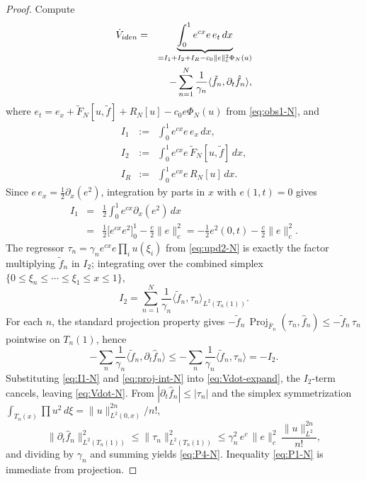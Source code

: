 \documentclass[10pt,a4paper]{amsart}
\DeclareMathOperator{\Proj}{Proj}
\begin{document}
\begin{proof}
Compute
\begin{eqnarray}
\dot V_{\rm iden} &=& \underbrace{\int_0^1 e^{cx}e\,e_t\,dx}_{=I_1+I_2+I_R-c_0\|e\|_c^2\Phi_N(u)} \nonumber\\
&& -\sum_{n=1}^N\frac{1}{\gamma_n}\langle\tilde f_n,\partial_t\hat f_n\rangle, \label{eq:Vdot-expand}
\end{eqnarray}
where $e_t=e_x+\tilde F_N[u,\tilde f]+R_N[u]-c_0 e\Phi_N(u)$ from \eqref{eq:obs1-N}, and
\begin{eqnarray}
I_1 &:=& \int_0^1 e^{cx}e\,e_x\,dx, \nonumber\\
I_2 &:=& \int_0^1 e^{cx}e\,\tilde F_N[u,\tilde f]\,dx, \nonumber\\
I_R &:=& \int_0^1 e^{cx}e\,R_N[u]\,dx. \label{eq:I123-def}
\end{eqnarray}
 Since $e\,e_x=\tfrac12\partial_x(e^2)$, integration by parts in $x$ with $e(1,t)=0$ gives
\begin{eqnarray}
I_1 &=& \tfrac12\int_0^1 e^{cx}\partial_x(e^2)\,dx \nonumber\\
&=& \tfrac12\bigl[e^{cx}e^2\bigr]_0^1-\tfrac{c}{2}\|e\|_c^2=-\tfrac12 e^2(0,t)-\tfrac{c}{2}\|e\|_c^2. \label{eq:I1-N}
\end{eqnarray}
 The regressor $\tau_n=\gamma_n e^{cx}e\prod_i u(\xi_i)$ from \eqref{eq:upd2-N} is exactly the factor multiplying $\tilde f_n$ in $I_2$; integrating over the combined simplex $\{0\le\xi_n\le\cdots\le\xi_1\le x\le 1\}$,
\begin{equation}\label{eq:I2-N}
I_2=\sum_{n=1}^N\frac{1}{\gamma_n}\langle\tilde f_n,\tau_n\rangle_{L^2(T_n(1))}.
\end{equation}
 For each $n$, the standard projection property gives $-\tilde f_n\,\Proj_{\bar F_n}(\tau_n,\hat f_n)\le-\tilde f_n\,\tau_n$ pointwise on $T_n(1)$, hence
\begin{equation}\label{eq:proj-int-N}
-\sum_n\frac{1}{\gamma_n}\langle\tilde f_n,\partial_t\hat f_n\rangle\le-\sum_n\frac{1}{\gamma_n}\langle\tilde f_n,\tau_n\rangle=-I_2.
\end{equation}
 Substituting \eqref{eq:I1-N} and \eqref{eq:proj-int-N} into \eqref{eq:Vdot-expand}, the $I_2$-term cancels, leaving \eqref{eq:Vdot-N}.
 From $|\partial_t\hat f_n|\le|\tau_n|$ and the simplex symmetrization $\int_{T_n(x)}\prod u^2\,d\xi=\|u\|^{2n}_{L^2(0,x)}/n!$,
\begin{equation}\label{eq:tau-bound}
\|\partial_t\hat f_n\|^2_{L^2(T_n(1))}\le\|\tau_n\|^2_{L^2(T_n(1))}\le \gamma_n^2\,e^c\,\|e\|_c^2\,\frac{\|u\|^{2n}_{L^2}}{n!},
\end{equation}
and dividing by $\gamma_n$ and summing yields \eqref{eq:P4-N}. Inequality \eqref{eq:P1-N} is immediate from  projection.
\end{proof}
\end{document}
